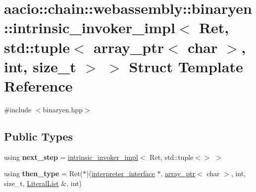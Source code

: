 \hypertarget{structaacio_1_1chain_1_1webassembly_1_1binaryen_1_1intrinsic__invoker__impl_3_01_ret_00_01std_1_c2994fb49e25761823d7a1668f557a77}{}\section{aacio\+:\+:chain\+:\+:webassembly\+:\+:binaryen\+:\+:intrinsic\+\_\+invoker\+\_\+impl$<$ Ret, std\+:\+:tuple$<$ array\+\_\+ptr$<$ char $>$, int, size\+\_\+t $>$ $>$ Struct Template Reference}
\label{structaacio_1_1chain_1_1webassembly_1_1binaryen_1_1intrinsic__invoker__impl_3_01_ret_00_01std_1_c2994fb49e25761823d7a1668f557a77}


{\ttfamily \#include $<$binaryen.\+hpp$>$}

\subsection*{Public Types}
\begin{DoxyCompactItemize}
\item 
\mbox{\label{structaacio_1_1chain_1_1webassembly_1_1binaryen_1_1intrinsic__invoker__impl_3_01_ret_00_01std_1_c2994fb49e25761823d7a1668f557a77_ae46752b22e988e022fc38867b67f1c68}} 
using {\bfseries next\+\_\+step} = \mbox{\hyperlink{structaacio_1_1chain_1_1webassembly_1_1binaryen_1_1intrinsic__invoker__impl}{intrinsic\+\_\+invoker\+\_\+impl}}$<$ Ret, std\+::tuple$<$$>$ $>$
\item 
\mbox{\label{structaacio_1_1chain_1_1webassembly_1_1binaryen_1_1intrinsic__invoker__impl_3_01_ret_00_01std_1_c2994fb49e25761823d7a1668f557a77_a1878975cce48e07e82838a4e2f4e158e}} 
using {\bfseries then\+\_\+type} = Ret($\ast$)(\mbox{\hyperlink{structaacio_1_1chain_1_1webassembly_1_1binaryen_1_1interpreter__interface}{interpreter\+\_\+interface}} $\ast$, \mbox{\hyperlink{structaacio_1_1chain_1_1array__ptr}{array\+\_\+ptr}}$<$ char $>$, int, size\+\_\+t, \mbox{\hyperlink{classstd_1_1vector}{Literal\+List}} \&, int)
\end{DoxyCompactItemize}
